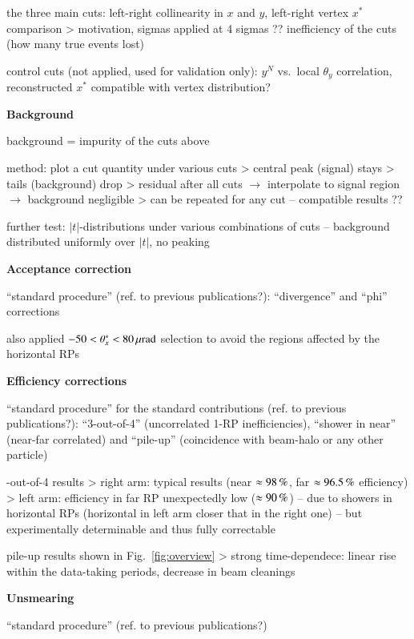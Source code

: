 \> the three main cuts: left-right collinearity in $x$ and $y$, left-right vertex $x^*$ comparison
\>> motivation, sigmas
\> applied at 4 sigmas ??
\> inefficiency of the cuts (how many true events lost)

\> control cuts (not applied, used for validation only): $y^{N}$ vs.~local $\theta_y$ correlation, reconstructed $x^*$ compatible with vertex distribution?


{\bf Background}

\> background = impurity of the cuts above

\> method: plot a cut quantity under various cuts
\>> central peak (signal) stays
\>> tails (background) drop
\>> residual after all cuts $\rightarrow$ interpolate to signal region $\rightarrow$ background negligible
\>> can be repeated for any cut -- compatible results ??

\> further test: $|t|$-distributions under various combinations of cuts -- background distributed uniformly over $|t|$, no peaking

{\bf Acceptance correction}

\> ``standard procedure'' (ref. to previous publications?): ``divergence'' and ``phi'' corrections

\> also applied $-50 < \theta_x^* < 80\,{\rm \mu rad}$ selection to avoid the regions affected by the horizontal RPs


{\bf Efficiency corrections}

\> ``standard procedure'' for the standard contributions (ref. to previous publications?): ``3-out-of-4'' (uncorrelated 1-RP inefficiencies), ``shower in near'' (near-far correlated) and ``pile-up'' (coincidence with beam-halo or any other particle)

-out-of-4 results
\>> right arm: typical results (near $\approx 98\,{\rm \%}$, far $\approx 96.5\,{\rm \%}$ efficiency)
\>> left arm: efficiency in far RP unexpectedly low ($\approx 90\,{\rm \%}$) -- due to showers in horizontal RPs (horizontal in left arm closer that in the right one) -- but experimentally determinable and thus fully correctable

\> pile-up results shown in Fig.~\ref{fig:overview}
\>> strong time-dependece: linear rise within the data-taking periods, decrease in beam cleanings


{\bf Unsmearing}

\> ``standard procedure'' (ref. to previous publications?)

